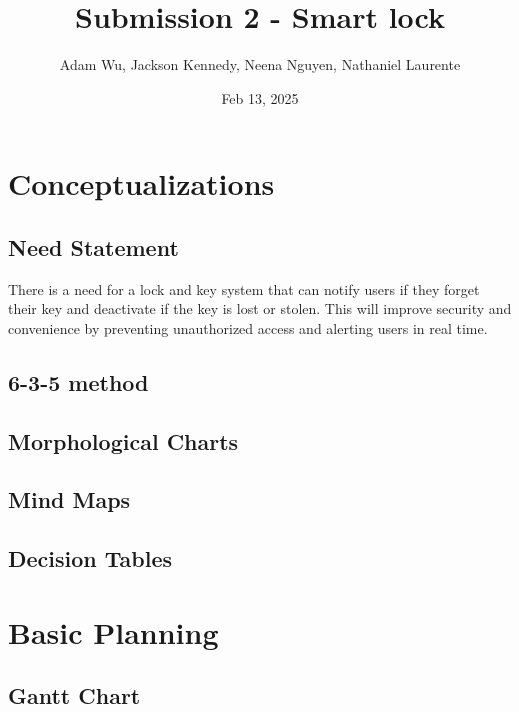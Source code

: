 \documentclass{article}
\title{Submission 2 - Smart lock} %
\author{Adam Wu, Jackson Kennedy, Neena Nguyen, Nathaniel Laurente}
\date{Feb 13, 2025}
\begin{document}
\maketitle

\tableofcontents
\newpage

\section{Conceptualizations}
\subsection{Need Statement}
There is a need for a lock and key system that can notify users if they forget their key and deactivate if the key is lost or stolen. This will improve security and convenience by preventing unauthorized access and alerting users in real time.


\subsection{6-3-5 method}

\subsection{Morphological Charts}

\subsection{Mind Maps}

\subsection{Decision Tables}

\section{Basic Planning}
\subsection{Gantt Chart}
\end{document}
